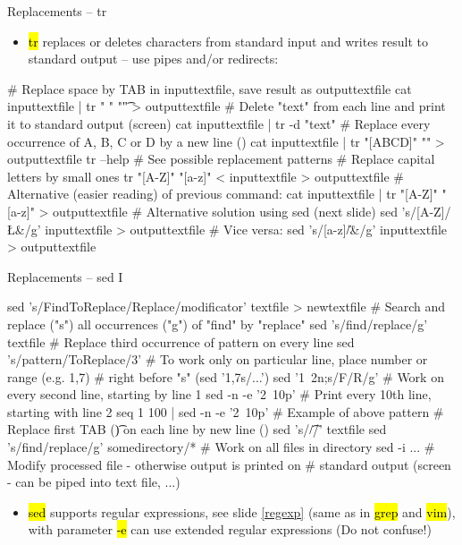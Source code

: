 \documentclass[compress, ucs, xelatex, 11pt, xcolor=svgnames,
  hyperref={
    bookmarks=true,
    unicode=true,
    colorlinks=true,
    pdftitle={Linux, command line and MetaCentrum},
    plainpages=false,
    pdfauthor={Vojtech Zeisek},
    pdfsubject={Course about use of Linux command line, writing shell scripts and using MetaCentrum of CESNET},
    pdfcreator={XeLaTeX},
    pdfkeywords={Linux, GNU, BASH, shell, command line, MetaCentrum},
    linkcolor=DarkRed,
    anchorcolor=DarkBlue,
    citecolor=Indigo,
    filecolor=NavyBlue,
    menucolor=DarkMagenta,
    urlcolor=DarkBlue,
    pdftex},
  url={hyphens, lowtilde} %
  ]{beamer}
\renewcommand{\texttt}[1]{\hl{\ttfamily #1}}
\begin{document}
\begin{frame}[fragile]{Replacements -- tr}
  \begin{itemize}
    \item \texttt{tr} replaces or deletes characters from standard input and writes result to standard output -- use pipes and/or redirects:
  \end{itemize}
  \begin{bashcode}
    # Replace space by TAB in inputtextfile, save result as outputtextfile
    cat inputtextfile | tr " " "\t" > outputtextfile
    # Delete "text" from each line and print it to standard output (screen)
    cat inputtextfile | tr -d "text"
    # Replace every occurrence of A, B, C or D by a new line (\n)
    cat inputtextfile | tr "[ABCD]" "\n" > outputtextfile
    tr --help # See possible replacement patterns
    # Replace capital letters by small ones
    tr "[A-Z]" "[a-z]" < inputtextfile > outputtextfile
    # Alternative (easier reading) of previous command:
    cat inputtextfile | tr "[A-Z]" "[a-z]" > outputtextfile
    # Alternative solution using sed (next slide)
    sed 's/[A-Z]/\L&/g' inputtextfile > outputtextfile # Vice versa:
    sed 's/[a-z]/\U&/g' inputtextfile > outputtextfile
  \end{bashcode}
\end{frame}

\begin{frame}[fragile]{Replacements -- sed I}
  \begin{bashcode}
    sed 's/FindToReplace/Replace/modificator' textfile > newtextfile
    # Search and replace ("s") all occurrences ("g") of "find" by "replace"
    sed 's/find/replace/g' textfile
    # Replace third occurrence of pattern on every line
    sed 's/pattern/ToReplace/3'
    # To work only on particular line, place number or range (e.g. 1,7)
    # right before "s" (sed '1,7s/...')
    sed '1~2n;s/F/R/g' # Work on every second line, starting by line 1
    sed -n -e '2~10p' # Print every 10th line, starting with line 2
    seq 1 100 | sed -n -e '2~10p' # Example of above pattern
    # Replace first TAB (\t) on each line by new line (\n)
    sed 's/\t/\n/' textfile
    sed 's/find/replace/g' somedirectory/* # Work on all files in directory
    sed -i ... # Modify processed file - otherwise output is printed on
               # standard output (screen - can be piped into text file, ...)
  \end{bashcode}
  \begin{itemize}
    \item \texttt{sed} supports regular expressions, see slide \ref{regexp} (same as in \texttt{grep} and \texttt{vim}), with parameter \texttt{-e} can use extended regular expressions (Do not confuse!)
  \end{itemize}
\end{frame}
\end{document}
